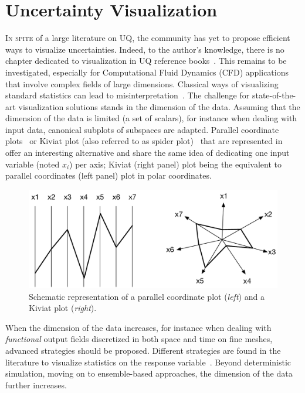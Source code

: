\section{Uncertainty Visualization}\label{sec:visu}
\lettrine{I}{n spite} of a large literature on UQ, the community has yet to propose efficient ways to visualize uncertainties. Indeed, to the author’s knowledge, there is no chapter dedicated to visualization in UQ reference books~\citep{saltelli2007,sullivan2015,handbookUQ}. This remains to be investigated, especially for Computational Fluid Dynamics (CFD) applications~\citep{Moreland2016} that involve complex fields of large dimensions. Classical ways of visualizing standard statistics can lead to misinterpretation~\citep{Anscombe1973}. The challenge for state-of-the-art visualization solutions stands in the dimension of the data. Assuming that the dimension of the data is limited (a set of scalars), for instance when dealing with input data, canonical subplots of subspaces are adapted. Parallel coordinate plots~\citep{Inselberg1985} or Kiviat plot (also referred to as spider plot)~\citep{Hackstadt1994} that are represented in~ offer an interesting alternative and share the same idea of dedicating one input variable (noted $x_i$) per axis; Kiviat (right panel) plot being the equivalent to parallel coordinates (left panel) plot in polar coordinates. 
\begin{figure}[!h]
\centering
\includegraphics[width=0.8\linewidth,keepaspectratio]{fig/literature/parallel-kiviat.pdf}
\caption{Schematic representation of a parallel coordinate plot (\emph{left}) and a Kiviat plot (\emph{right}).}
\label{fig:sketch_Kiviat-parallel}
\end{figure}
When the dimension of the data increases, for instance when dealing with \emph{functional} output fields discretized in both space and time on fine meshes, advanced strategies should be proposed. Different strategies are found in the literature to visualize statistics on the response variable~\citep{Potter2012a,Brodlie2012,Bonneau2014}. Beyond deterministic simulation, moving on to ensemble-based approaches, the dimension of the data further increases.

